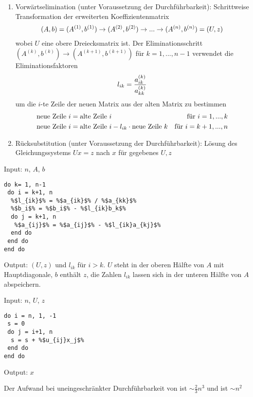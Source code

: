 \begin{enumerate}[label=\textbf{\arabic*.}]
	\item Vorwärtselimination (unter Voraussetzung der Durchführbarkeit): Schrittweise Transformation der erweiterten Koeffizientenmatrix
	\begin{align}
		(A,b) = (A^{(1)},b^{(1)})\to (A^{(2)},b^{(2)})\to ...\to (A^{(n)},b^{(n)})=(U,z)\notag
	\end{align}
	wobei $U$ eine obere Dreiecksmatrix ist. Der Eliminationsschritt $(A^{(k)},b^{(k)})\to(A^{(k+1)},b^{(k+1)})$ für $k=1,...,n-1$ verwendet die Eliminationsfaktoren
	\begin{align}
		l_{ik} = \frac{a_{ik}^{(k)}}{a_{kk}^{(k)}}\notag
	\end{align}
	um die $i$-te Zeile der neuen Matrix aus der alten Matrix zu bestimmen
	\begin{align}
		\text{neue Zeile }i &= \text{alte Zeile }i &\text{für } i=1,...,k \notag \\
		\text{neue Zeile }i &= \text{alte Zeile }i - l_{ik}\cdot\text{neue Zeile }k &\text{für } i=k+1,...,n\notag
	\end{align}
	\item Rücksubstitution (unter Voraussetzung der Durchführbarkeit): Lösung des Gleichungssystems $Ux=z$ nach $x$ für gegebenes $U,z$
\end{enumerate}

\begin{algorithm}[Vorwärtselimination]
	Input: $n$, $A$, $b$
\begin{lstlisting}
do k= 1, n-1
 do i = k+1, n
  %$l_{ik}$% = %$a_{ik}$% / %$a_{kk}$%
  %$b_i$% = %$b_i$% - %$l_{ik}b_k$%
  do j = k+1, n 
   %$a_{ij}$% = %$a_{ij}$% - %$l_{ik}a_{kj}$%
  end do
 end do
end do
\end{lstlisting}
	Output: $(U,z)$ und $l_{ik}$ für $i>k$. $U$ steht in der oberen Hälfte von $A$ mit Hauptdiagonale, $b$ enthält $z$, die Zahlen $l_{ik}$ lassen sich in der unteren Hälfte von $A$ abspeichern.
\end{algorithm}

\begin{algorithm}[Rücksubstitution]
	Input: $n$, $U$, $z$
\begin{lstlisting}
do i = n, 1, -1
 s = 0
 do j = i+1, n
  s = s + %$u_{ij}x_j$%
 end do
end do
\end{lstlisting}
	Output: $x$
\end{algorithm}

Der Aufwand bei uneingeschränkter Durchführbarkeit von  ist $\sim \frac{2}{3}n^3$ und  ist $\sim n^2$

